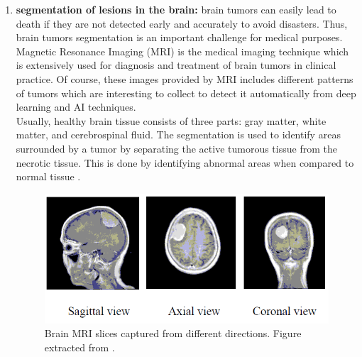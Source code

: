 \documentclass[11pt, openany]{report}
\theoremstyle{plain}
\theoremstyle{definition}
\theoremstyle{remark}
\begin{document}
\begin{enumerate}
\item \textbf{segmentation of lesions in the brain:} brain tumors can easily lead to death if they are not detected early and accurately to avoid disasters. Thus, brain tumors segmentation is an important challenge for medical purposes. Magnetic Resonance Imaging (MRI) is the medical imaging technique which is extensively used for diagnosis and treatment of brain tumors in clinical practice. Of course, these images provided by MRI includes different patterns of tumors which are interesting to collect to detect it automatically from deep learning and AI techniques. \\
Usually, healthy brain tissue consists of three parts: gray matter, white matter, and cerebrospinal fluid. The segmentation is used to identify areas surrounded by a tumor by separating the active tumorous tissue from the necrotic tissue. This is done by identifying abnormal areas when compared to normal tissue \cite{brain-tumor-1}. 

\begin{figure}[h]
  \centering
  \includegraphics[scale=0.5]{figures/brain-images-examples.png}
  \caption{Brain MRI slices captured from different directions. Figure extracted from \cite{brain-tumor-1}.}
  \label{fig:brain-example}
\end{figure}


\end{enumerate}
\end{document}
